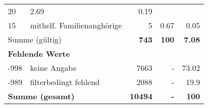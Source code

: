 \begin{longtable}{lXrrr}
       \num{20} &
       \num[round-mode=places,round-precision=2]{2,69} &
         \num[round-mode=places,round-precision=2]{0,19} \\

     15 &
     \multicolumn{1}{X}{ mithelf. Familienanghörige   } &


       \num{5} &
       \num[round-mode=places,round-precision=2]{0,67} &
         \num[round-mode=places,round-precision=2]{0,05} \\
     \midrule
     \multicolumn{2}{l}{Summe (gültig)} &
       \textbf{\num{743}} &
     \textbf{100} &
       \textbf{\num[round-mode=places,round-precision=2]{7,08}} \\
     \multicolumn{5}{l}{\textbf{Fehlende Werte}}\\
       -998 &
       keine Angabe &
         \num{7663} &
        - &
         \num[round-mode=places,round-precision=2]{73,02} \\
       -989 &
       filterbedingt fehlend &
         \num{2088} &
        - &
         \num[round-mode=places,round-precision=2]{19,9} \\
     \midrule
     \multicolumn{2}{l}{\textbf{Summe (gesamt)}} &
          \textbf{\num{10494}} &
        \textbf{-} &
        \textbf{100} \\
     \bottomrule
     \end{longtable}
     
